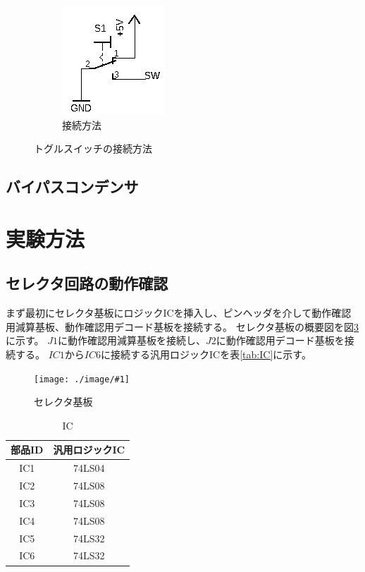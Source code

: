 \documentclass[a4paper,11pt]{ltjsarticle}
\newcommand{\fig}[4]{
    \begin{figure}[htbp]
      \centering
      \texttt{[image: ./image/\#1]}
      \caption{#2}
      \label{fig:#3}
    \end{figure}
  }
\begin{document}
\begin{figure}[htbp]
\begin{subfigure}{0.4\columnwidth}
    \includegraphics[width=0.8\columnwidth]{./image/toggle_b.png}
    \caption{接続方法}
    \label{fig:toggle_b}
  \end{subfigure}
  \caption{トグルスイッチの接続方法}
\end{figure}

\subsection{バイパスコンデンサ}

\section{実験方法}
\subsection{セレクタ回路の動作確認}
まず最初にセレクタ基板にロジックICを挿入し、ピンヘッダを介して動作確認用減算基板、動作確認用デコード基板を接続する。
セレクタ基板の概要図を図\ref{fig:selector}に示す。
$J1$に動作確認用減算基板を接続し、$J2$に動作確認用デコード基板を接続する。
$IC1$から$IC6$に接続する汎用ロジックICを表\ref{tab:IC}に示す。
\fig{kiban.drawio.png}{セレクタ基板}{selector}{0.6}
\begin{table}[htbp]
  \centering
  \caption{IC}
  \begin{tabular}{|c|c|}
    \hline
    部品ID  &  汎用ロジックIC  \\
    \hline
    IC1  &  74LS04  \\
    IC2  &  74LS08  \\
    IC3  &  74LS08  \\
    IC4  &  74LS08  \\
    IC5  &  74LS32  \\
    IC6  &  74LS32  \\
    \hline
  \end{tabular}
\end{table}
\newpage
\end{document}
